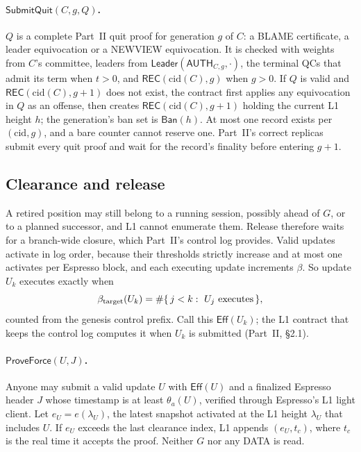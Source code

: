 \documentclass[11pt,a4paper]{article}
\newcommand{\tagg}[1]{\mathsf{#1}}
\newcommand{\Ban}{\mathsf{Ban}}
\newcommand{\cid}{\mathrm{cid}}
\begin{document}
\paragraph{$\tagg{SubmitQuit}(C,g,Q)$.} $Q$ is a complete Part~II quit
proof for generation $g$ of $C$: a BLAME certificate, a leader
equivocation or a NEWVIEW equivocation. It is checked with weights from
$C$'s committee, leaders from $\tagg{Leader}(\tagg{AUTH}_{C,g},\cdot)$, the
terminal QCs that admit its term when $t>0$, and $\tagg{REC}(\cid(C),g)$
when $g>0$. If $Q$ is valid and $\tagg{REC}(\cid(C),g+1)$ does not exist,
the contract first applies any equivocation in $Q$ as an offense, then
creates $\tagg{REC}(\cid(C),g+1)$ holding the current L1 height $h$; the
generation's ban set is $\Ban(h)$.
At most one record exists per $(\cid,g)$, and a bare counter cannot
reserve one. Part~II's correct replicas submit every quit proof and wait
for the record's finality before entering $g+1$.

\subsection{Clearance and release}
\label{sec:release}
A retired position may still belong to a running session, possibly ahead
of $G$, or to a planned successor, and L1 cannot enumerate them. Release
therefore waits for a branch-wide closure, which Part~II's control log
provides. Valid updates activate in log order, because their thresholds
strictly increase and at most one activates per Espresso block, and each
executing update increments $\beta$. So update $U_k$ executes exactly when
\begin{equation}\label{eq:eff}
 \beta_{\rm target}(U_k)=\#\{\,j<k:\ U_j\text{ executes}\,\},
\end{equation}
counted from the genesis control prefix. Call this $\tagg{Eff}(U_k)$; the
L1 contract that keeps the control log computes it when $U_k$ is
submitted (Part~II, \S2.1).

\paragraph{$\tagg{ProveForce}(U,J)$.} Anyone may submit a valid update $U$
with $\tagg{Eff}(U)$ and a finalized Espresso header $J$ whose timestamp
is at least $\theta_a(U)$, verified through Espresso's L1 light client.
Let $e_U=e(\lambda_U)$, the latest snapshot activated at the L1 height
$\lambda_U$ that includes $U$. If $e_U$ exceeds the last clearance index,
L1 appends $(e_U,t_c)$, where $t_c$ is the real time it accepts the proof.
Neither $G$ nor any DATA is read.
\end{document}
